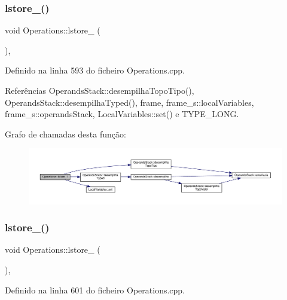 \subsubsection{\texorpdfstring{lstore\+\_()}{lstore\_1()}}
{\footnotesize\ttfamily void Operations\+::lstore\+\_ (\begin{DoxyParamCaption}{ }\end{DoxyParamCaption})\hspace{0.3cm}{\ttfamily [static]}, {\ttfamily [private]}}



Definido na linha 593 do ficheiro Operations.\+cpp.



Referências Operands\+Stack\+::desempilha\+Topo\+Tipo(), Operands\+Stack\+::desempilha\+Typed(), frame, frame\+\_\+s\+::local\+Variables, frame\+\_\+s\+::operands\+Stack, Local\+Variables\+::set() e T\+Y\+P\+E\+\_\+\+L\+O\+NG.

Grafo de chamadas desta função\+:\nopagebreak
\begin{figure}[H]
\begin{center}
\leavevmode
\includegraphics[width=350pt]{classOperations_aa162cef00367e3d5fb5dca12494a5793_cgraph}
\end{center}
\end{figure}
\mbox{\label{classOperations_a178660c2b3ca2625c140daf867531386}} 
\subsubsection{\texorpdfstring{lstore\+\_()}{lstore\_2()}}
{\footnotesize\ttfamily void Operations\+::lstore\+\_ (\begin{DoxyParamCaption}{ }\end{DoxyParamCaption})\hspace{0.3cm}{\ttfamily [static]}, {\ttfamily [private]}}



Definido na linha 601 do ficheiro Operations.\+cpp.



